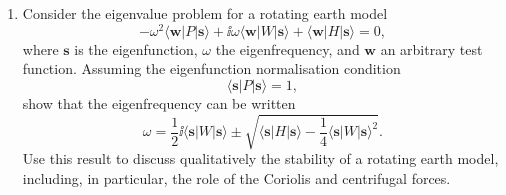 \begin{enumerate}
\item Consider the eigenvalue problem for a rotating earth model
\begin{equation*}
    -\omega^{2}\langle \mathbf{w}|P|\mathbf{s}\rangle+\ii\omega\langle \mathbf{w}|W|\mathbf{s}\rangle+\langle \mathbf{w}|H|\mathbf{s}\rangle=0,
\end{equation*}
where $\mathbf{s}$ is the eigenfunction, $\omega$ the eigenfrequency, and $\mathbf{w}$ an arbitrary test function. Assuming the eigenfunction normalisation condition
\begin{equation*}
    \langle \mathbf{s}|P|\mathbf{s}\rangle=1,
\end{equation*}
show that the eigenfrequency can be written
\begin{equation*}
    \omega=\frac{1}{2}\ii\langle \mathbf{s}|W|\mathbf{s}\rangle\pm\sqrt{\langle \mathbf{s}|H|\mathbf{s}\rangle-\frac{1}{4}\langle \mathbf{s}|W|\mathbf{s}\rangle^{2}}.
\end{equation*}
Use this result to discuss qualitatively the stability of a rotating earth model, including, in particular, the role of the Coriolis and centrifugal forces.


\end{enumerate}

